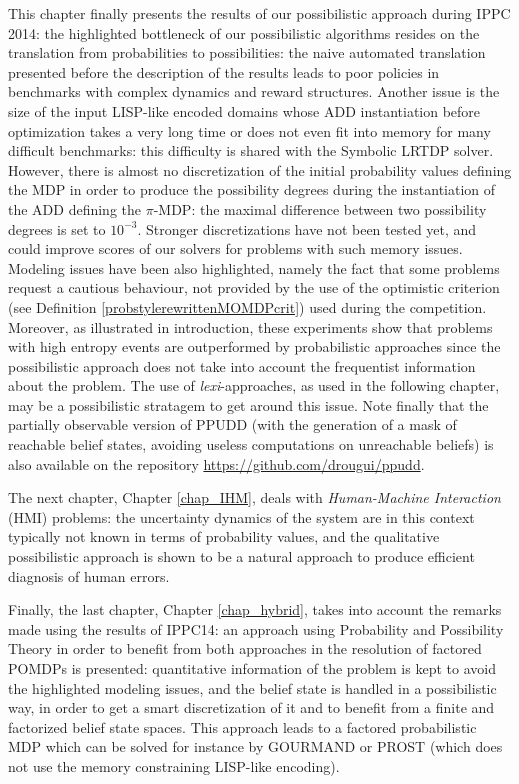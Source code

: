 This chapter finally presents the results of our possibilistic approach
during IPPC 2014: 
the highlighted bottleneck of our possibilistic algorithms
resides on the translation from probabilities to possibilities: 
the naive automated translation presented before the description of the results 
leads to poor policies in benchmarks with complex dynamics and reward structures.
Another issue is the size of the input LISP-like encoded domains whose ADD
instantiation before optimization takes a very long time or 
does not even fit into memory for many difficult benchmarks:
this difficulty is shared with the Symbolic LRTDP solver.
However, there is almost no discretization of the initial probability values defining the MDP
in order to produce the possibility degrees
during the instantiation of the ADD defining the $\pi$-MDP:
the maximal difference between two possibility degrees is set to $10^{-3}$.
Stronger discretizations have not been tested yet, 
and could improve scores of our solvers for problems with such memory issues.
Modeling issues have been also highlighted, 
namely the fact that some problems request 
a cautious behaviour, not provided by the use of
the optimistic criterion (see Definition \ref{probstylerewrittenMOMDPcrit}) 
used during the competition. 
Moreover, as illustrated in introduction, 
these experiments show that problems with high entropy events 
are outperformed by probabilistic approaches since the possibilistic 
approach does not take into account the frequentist information about the problem.
The use of \textit{lexi}-approaches, as used in the following chapter, 
may be a possibilistic stratagem to get around this issue.
Note finally that the partially observable version of PPUDD 
(with the generation of a mask of reachable belief states, avoiding useless computations
on unreachable beliefs) is also available on the repository \url{https://github.com/drougui/ppudd}.

The next chapter, Chapter \ref{chap_IHM}, deals with \textit{Human-Machine Interaction} (HMI)
problems: the uncertainty dynamics of the system are in this context typically not known in terms
of probability values, and the qualitative possibilistic approach is shown to be a natural approach
to produce efficient diagnosis of human errors.

Finally, the last chapter, Chapter \ref{chap_hybrid},
takes into account the remarks made using the results of IPPC14:
an approach using Probability and Possibility Theory
in order to benefit from both approaches in the resolution of factored POMDPs
is presented: quantitative information of the problem is kept to avoid the highlighted modeling issues,
and the belief state is handled in a possibilistic way, in order to get a smart discretization of it
and to benefit from a finite and factorized belief state spaces.
This approach leads to a factored probabilistic MDP 
which can be solved for instance by GOURMAND or PROST
(which does not use the memory constraining LISP-like encoding).


